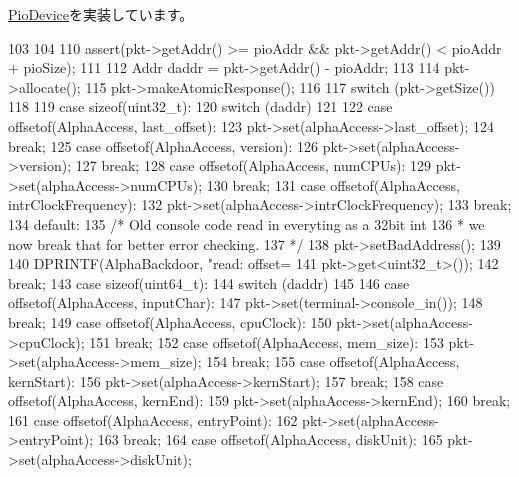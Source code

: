 \hyperlink{classPioDevice_a842312590432036092c422c87a442358}{PioDevice}を実装しています。


\begin{DoxyCode}
103 {
104 
110     assert(pkt->getAddr() >= pioAddr && pkt->getAddr() < pioAddr + pioSize);
111 
112     Addr daddr = pkt->getAddr() - pioAddr;
113 
114     pkt->allocate();
115     pkt->makeAtomicResponse();
116 
117     switch (pkt->getSize())
118     {
119         case sizeof(uint32_t):
120             switch (daddr)
121             {
122                 case offsetof(AlphaAccess, last_offset):
123                     pkt->set(alphaAccess->last_offset);
124                     break;
125                 case offsetof(AlphaAccess, version):
126                     pkt->set(alphaAccess->version);
127                     break;
128                 case offsetof(AlphaAccess, numCPUs):
129                     pkt->set(alphaAccess->numCPUs);
130                     break;
131                 case offsetof(AlphaAccess, intrClockFrequency):
132                     pkt->set(alphaAccess->intrClockFrequency);
133                     break;
134                 default:
135                     /* Old console code read in everyting as a 32bit int
136                      * we now break that for better error checking.
137                      */
138                   pkt->setBadAddress();
139             }
140             DPRINTF(AlphaBackdoor, "read: offset=%
141                     pkt->get<uint32_t>());
142             break;
143         case sizeof(uint64_t):
144             switch (daddr)
145             {
146                 case offsetof(AlphaAccess, inputChar):
147                     pkt->set(terminal->console_in());
148                     break;
149                 case offsetof(AlphaAccess, cpuClock):
150                     pkt->set(alphaAccess->cpuClock);
151                     break;
152                 case offsetof(AlphaAccess, mem_size):
153                     pkt->set(alphaAccess->mem_size);
154                     break;
155                 case offsetof(AlphaAccess, kernStart):
156                     pkt->set(alphaAccess->kernStart);
157                     break;
158                 case offsetof(AlphaAccess, kernEnd):
159                     pkt->set(alphaAccess->kernEnd);
160                     break;
161                 case offsetof(AlphaAccess, entryPoint):
162                     pkt->set(alphaAccess->entryPoint);
163                     break;
164                 case offsetof(AlphaAccess, diskUnit):
165                     pkt->set(alphaAccess->diskUnit);
}}}
\end{DoxyCode}
